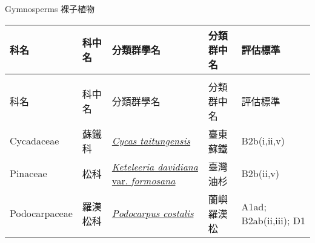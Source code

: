 \noindent\normalfont\selectfont Gymnosperms 裸子植物
\footnotesize\selectfont
        {\def\arraystretch{1.5}\tabcolsep=2pt
        \begin{longtable}{p{2.5cm}p{2.5cm}p{4.5cm}p{2.5cm}p{3cm}}
        \toprule
          科名 & 科中名 & 分類群學名 & 分類群中名 & 評估標準 \\
        \midrule 
        \endfirsthead

        \multicolumn{4}{l}{\bfseries\Large\color{red}{國家極危 (NCR) 類別維管束植物名錄(續)}} \\
        \toprule
        科名 & 科中名 & 分類群學名 & 分類群中名 & 評估標準 \\
        \midrule
        \endhead
                Cycadaceae & 蘇鐵科 & \href{http://www.theplantlist.org/tpl1.1/search?q=Cycas+taitungensis}{\textit{Cycas taitungensis} } & 臺東蘇鐵 & B2b(i,ii,v) \index{Cycas@\textit{Cycas}!taitungensis@\textit{taitungensis}}  \index{臺東蘇鐵} \\
    Pinaceae & 松科 & \href{http://www.theplantlist.org/tpl1.1/search?q=Keteleeria+davidiana+var.+formosana}{\textit{Keteleeria davidiana} var. \textit{formosana} } & 臺灣油杉 & B2b(ii,v) \index{Keteleeria@\textit{Keteleeria}!davidiana@\textit{davidiana}!var. formosana@var. \textit{formosana}}  \index{臺灣油杉} \\
    Podocarpaceae & 羅漢松科 & \href{http://www.theplantlist.org/tpl1.1/search?q=Podocarpus+costalis}{\textit{Podocarpus costalis} } & 蘭嶼羅漢松 & A1ad; B2ab(ii,iii); D1 \index{Podocarpus@\textit{Podocarpus}!costalis@\textit{costalis}}  \index{蘭嶼羅漢松} \\
    \bottomrule
        \end{longtable}
        }
    